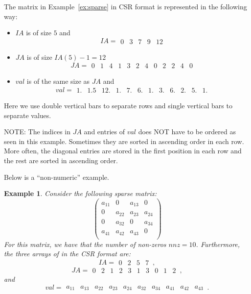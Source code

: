 \documentclass[11pt]{memoir}
\newtheorem{example}[theorem]{Example}
\begin{document}
The matrix in Example~\ref{ex:sparse} in CSR format is represented in the following way:
\begin{itemize}
\item $IA$ is of size $5$ and
$$IA =
\begin{array}{||c||c||c||c||c||}0&3&7&9&12\end{array}
$$
\item $JA$ is of size $IA(5)-1=12$
$$JA =
\begin{array}{||c|c|c||c|c|c|c||c|c||c|c|c||}
0&1&4&1&3&2&4&0&2&2&4&0
\end{array}
$$
\item $val$ is of the same size as $JA$ and
$$val =
\begin{array}{||c|c|c||c|c|c|c||c|c||c|c|c||}
1.&1.5&12.&1.&7.&6.&1.&3.&6.&2.&5.&1.
\end{array}
$$
\end{itemize}
Here we use double vertical bars to separate rows and single vertical bars to separate values.

\begin{snugshade}\noindent
NOTE: The indices in $JA$ and entries of $val$ does NOT have to be ordered as seen in this example. Sometimes they are sorted in ascending order in each row. More often, the diagonal entries are stored in the first position in each row and the rest are sorted in ascending order.
\end{snugshade}

Below is a ``non-numeric'' example.
%
\begin{example} Consider the following sparse matrix:
$$
\left(
\begin{array}{cccc}
a_{11} & 0 & a_{13} & 0 \\
0 & a_{22} & a_{23} & a_{24} \\
0 & a_{32} & 0 & a_{34} \\
a_{41}& a_{42} & a_{43} & 0 \\
\end{array}
\right)
$$
For this matrix, we have that the number of non-zeros $nnz=10$. Furthermore, the three arrays of in the CSR format are:
$$
IA =
\begin{array}{||c||c||c||c||}0&2&5&7\end{array}\, ,
$$
$$
JA =
\begin{array}{||c|c||c|c|c||c|c||c|c|c||}
0&2&1&2&3&1&3&0&1&2\end{array}\, ,
$$
and
$$
val =
\begin{array}{||c|c||c|c|c||c|c||c|c|c||}
a_{11} & a_{13} & a_{22} & a_{23} & a_{24} & a_{32} & a_{34} & a_{41} & a_{42} & a_{43}\end{array}\,.
$$
\end{example}
\end{document}
